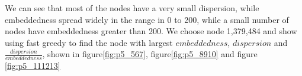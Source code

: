 \documentclass{article}
\begin{document}
We can see that most of the nodes have a very small dispersion, while embeddedness spread widely in the range in 0 to 200, while a small number of nodes have embeddedness greater than 200. 
\newpage
We choose node 1,379,484 and show using fast greedy to find the node with largest $embeddedness$, $dispersion$ and $\frac{dispersion}{embeddedness}$, shown in figure\ref{fig:p5_567}, figure\ref{fig:p5_8910} and figure \ref{fig:p5_111213} \\ 
\begin{figure}[htbp]
\centering
{}
\end{figure}
\end{document}
